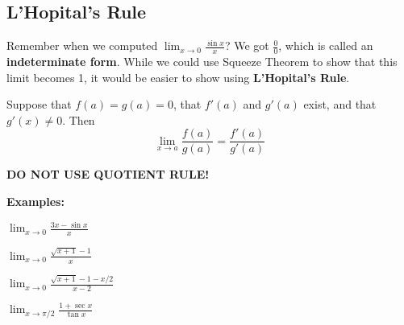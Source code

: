 \subsection*{L'Hopital's Rule}
Remember when we computed $\displaystyle\lim_{x\to0}\frac{\sin x}{x}$? We got $\frac{0}{0}$, which is called an \textbf{indeterminate form}. While we could use Squeeze Theorem to show that this limit becomes 1, it would be easier to show using \textbf{L'Hopital's Rule}.

\begin{tcolorbox}[title= L'HOPITAL'S RULE,colframe=black,sharp corners,colback=white,colbacktitle=white,coltitle=black,boxrule=1pt]

    Suppose that $f(a)=g(a)=0$, that $f'(a)$ and $g'(a)$ exist, and that $g'(x)\ne0$. Then
    \[\lim_{x\to a}\frac{f(a)}{g(a)}=\frac{f'(a)}{g'(a)}\]
    
\end{tcolorbox}

\begin{center}
    \textbf{\large DO NOT USE QUOTIENT RULE!}
\end{center}
\noindent\textbf{Examples:}
\begin{questions}
    \question $\displaystyle \lim_{x\to0}\frac{3x-\sin x}{x}$
    
    \question $\displaystyle \lim_{x\to0}\frac{\sqrt{x+1}-1}{x}$
    
    \question $\displaystyle \lim_{x\to0}\frac{\sqrt{x+1}-1-x/2}{x-2}$
    
    \question $\displaystyle \lim_{x\to\pi/2}\frac{1+\sec x}{\tan x}$
\end{questions}




\newpage
